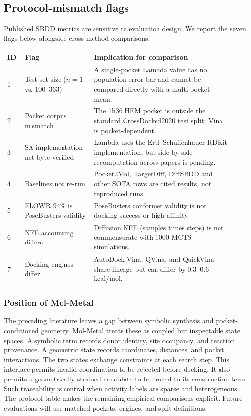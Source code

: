 \documentclass{article}
\begin{document}
\subsection{Protocol-mismatch flags}
Published SBDD metrics are sensitive to evaluation design. We report the seven flags below alongside cross-method comparisons.

\begin{longtable}{p{0.06\linewidth}p{0.28\linewidth}p{0.58\linewidth}}
\toprule
ID & Flag & Implication for comparison\\
\midrule
1 & Test-set size ($n=1$ vs. 100--363) & A single-pocket Lambda value has no population error bar and cannot be compared directly with a multi-pocket mean.\\
2 & Pocket corpus mismatch & The 1h36 HEM pocket is outside the standard CrossDocked2020 test split; Vina is pocket-dependent.\\
3 & SA implementation not byte-verified & Lambda uses the Ertl--Schuffenhauer RDKit implementation, but side-by-side recomputation across papers is pending.\\
4 & Baselines not re-run & Pocket2Mol, TargetDiff, DiffSBDD and other SOTA rows are cited results, not reproduced runs.\\
5 & FLOWR 94\% is PoseBusters validity & PoseBusters conformer validity is not docking success or high affinity.\\
6 & NFE accounting differs & Diffusion NFE (samples times steps) is not commensurate with 1000 MCTS simulations.\\
7 & Docking engines differ & AutoDock Vina, QVina, and QuickVina share lineage but can differ by 0.3--0.6 kcal/mol.\\
\bottomrule
\end{longtable}

\subsubsection{Position of Mol-Metal}
The preceding literature leaves a gap between symbolic synthesis and pocket-conditioned geometry.
Mol-Metal treats these as coupled but inspectable state spaces.
A symbolic term records donor identity, site occupancy, and reaction provenance.
A geometric state records coordinates, distances, and pocket interactions.
The two states exchange constraints at each search step.
This interface permits invalid coordination to be rejected before docking.
It also permits a geometrically strained candidate to be traced to its construction term.
Such traceability is central when activity labels are sparse and heterogeneous.
The protocol table makes the remaining empirical comparisons explicit.
Future evaluations will use matched pockets, engines, and split definitions.
\end{document}
